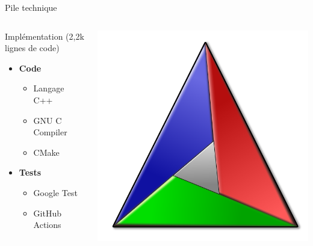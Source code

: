 \documentclass[french, 12pt]{beamer}
\begin{document}
\begin{frame}{Pile technique}
\begin{columns}
    \begin{column}{0.5\textwidth}
        Implémentation (2,2k lignes de code)
        \begin{itemize}
            \item \textbf{Code}
            \begin{itemize}
                \item Langage C++
                \item GNU C Compiler
                \item CMake
            \end{itemize}
            \item \textbf{Tests}
            \begin{itemize}
                \item Google Test
                \item GitHub Actions
            \end{itemize}
        \end{itemize}
    \end{column}
    \begin{column}{0.5\textwidth}
        \begin{center}
            
            

            \includegraphics[scale=0.1]{./images/cmake-logo.png}
        \end{center}
    \end{column}
\end{columns}
\end{frame}
\end{document}
